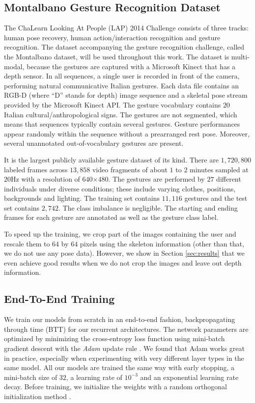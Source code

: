 \documentclass[11pt,a4paper]{article} \usepackage{a4wide}
\begin{document}
\subsection{Montalbano Gesture Recognition Dataset} \label{sec:dataset}
The ChaLearn Looking At People (LAP) 2014 Challenge \citep{chalearn14} consists of three tracks: human pose recovery, human action/interaction recognition and gesture recognition. The dataset accompanying the gesture recognition challenge, called the Montalbano dataset, will be used throughout this work. The dataset is multi-modal, because the gestures are captured with a Microsoft Kinect that has a depth sensor. In all sequences, a single user is recorded in front of the camera, performing natural communicative Italian gestures. Each data file contains an RGB-D (where ``D'' stands for depth) image sequence and a skeletal pose stream provided by the Microsoft Kinect API. The gesture vocabulary contains $20$ Italian cultural/anthropological signs. The gestures are not segmented, which means that sequences typically contain several gestures. Gesture performances appear randomly within the sequence without a prearranged rest pose. Moreover, several unannotated out-of-vocabulary gestures are present. 

It is the largest publicly available gesture dataset of its kind. There are $1,720,800$ labeled frames across $13,858$ video fragments of about $1$ to $2$ minutes sampled at $20$Hz with a resolution of $640$$\times$$480$. The gestures are performed by $27$ different individuals under diverse conditions; these include varying clothes, positions, backgrounds and lighting. The training set contains $11,116$ gestures and the test set contains $2,742$. The class imbalance is negligible. The starting and ending frames for each gesture are annotated as well as the gesture class label.

To speed up the training, we crop part of the images containing the user and rescale them to $64$ by $64$ pixels using the skeleton information (other than that, we do not use any pose data).
However, we show in Section \ref{sec:results} that we even achieve good results when we do not crop the images and leave out depth information.

\subsection{End-To-End Training} \label{sec:train}

We train our models from scratch in an end-to-end fashion, backpropagating through time (BTT) for our recurrent architectures. The network parameters are optimized by minimizing the cross-entropy loss function using mini-batch gradient descent with the \emph{Adam} update rule \citep{kingma2014adam}. 
We found that Adam works great in practice, especially when experimenting with very different layer types in the same model.  
All our models are trained the same way with early stopping, a mini-batch size of $32$, a learning rate of $10^{-3}$ and an exponential learning rate decay. 
Before training, we initialize the weights with a random orthogonal initialization method \citep{saxe2013exact}.
\end{document}

